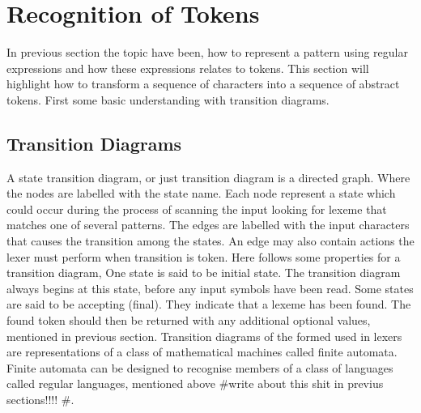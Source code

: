 \section{Recognition of Tokens}
In previous section the topic have been, how to represent a pattern using 
regular expressions and how these expressions relates to tokens. This section 
will highlight how to transform a sequence of characters into a sequence of 
abstract tokens. First some basic understanding with transition diagrams.  
\subsection{Transition Diagrams}
A state transition diagram, or just transition diagram is a directed graph. 
Where the nodes are labelled with the state name. Each node 
represent a state which could occur during the process of scanning the input 
looking for lexeme that matches one of several patterns.\cite{Aho2006} The 
edges are labelled with the input characters that causes the transition among 
the states. An edge may also contain actions the lexer must perform when 
transition is token.\cite{sebesta2012} Here follows some properties for a 
transition diagram, One state is said to be initial state. The transition 
diagram always begins at this state, before any input symbols have been read. 
Some states are said to be accepting (final). They indicate that a lexeme has 
been found. The found token should then be returned with any additional 
optional values, mentioned in previous section.\cite{Aho2006}
Transition diagrams of the formed used in lexers are representations of a class 
of mathematical machines called finite automata. Finite automata can be 
designed to recognise members of a class of languages called regular languages, 
mentioned above \#write about this shit in previus sections!!!! \#.
\cite{sebesta2012} 
\sectionbreak
